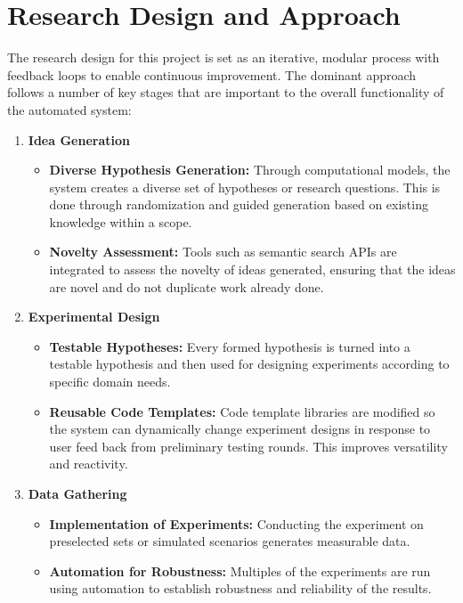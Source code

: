 \section{Research Design and Approach}
The research design for this project is set as an iterative, modular process with feedback loops to enable continuous improvement. The dominant approach follows a number of key stages that are important to the overall functionality of the automated system:
\begin{enumerate}
    \item \textbf{Idea Generation}
    \begin{itemize}
        \item \textbf{Diverse Hypothesis Generation:} Through computational models, the system creates a diverse set of hypotheses or research questions. This is done through randomization and guided generation based on existing knowledge within a scope.
        \item \textbf{Novelty Assessment:} Tools such as semantic search APIs are integrated to assess the novelty of ideas generated, ensuring that the ideas are novel and do not duplicate work already done.
    \end{itemize}

    \item \textbf{Experimental Design}
    \begin{itemize}
        \item \textbf{Testable Hypotheses:} Every formed hypothesis is turned into a testable hypothesis and then used for designing experiments according to specific domain needs.
        \item \textbf{Reusable Code Templates:} Code template libraries are modified so the system can dynamically change experiment designs in response to user feed back from preliminary testing rounds. This improves versatility and reactivity.
    \end{itemize}

    \item \textbf{Data Gathering}
    \begin{itemize}
        \item \textbf{Implementation of Experiments:} Conducting the experiment on preselected sets or simulated scenarios generates measurable data.
        \item \textbf{Automation for Robustness:} Multiples of the experiments are run using automation to establish robustness and reliability of the results.
    \end{itemize}


\end{enumerate}

